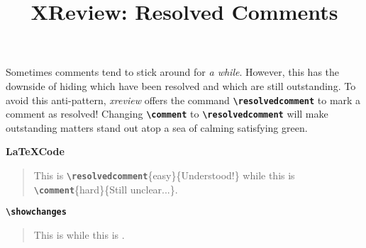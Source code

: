 \documentclass[10pt]{article}
\title{XReview: Resolved Comments}
\date{}
\newcommand{\writecommand}[1]{\texttt{\textbf{{\textbackslash#1}}}}
\newcommand{\writearg}[1]{\{#1\}}
\begin{document}
\maketitle

Sometimes comments tend to stick around for \textit{a while}. However, this has the downside of hiding which have been resolved and which are still outstanding. 
To avoid this anti-pattern, \textit{xreview} offers the command \writecommand{resolvedcomment} to mark a comment as resolved!
Changing \writecommand{comment} to \writecommand{resolvedcomment} will make outstanding matters stand out atop a sea of calming satisfying green.
~\newline

\textbf{\LaTeX Code}

\begin{quote}
    This is \writecommand{resolvedcomment}\writearg{easy}\writearg{Understood!} while this is \writecommand{comment}\writearg{hard}\writearg{Still unclear...}.
\end{quote}

\writecommand{showchanges}
\showchanges

\begin{quote}
This is  while this is .
\end{quote}
\end{document}
